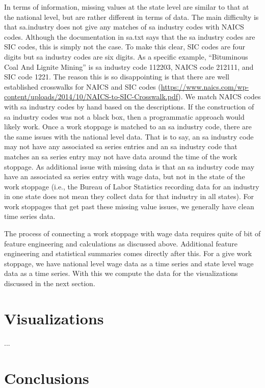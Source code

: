 \documentclass[reqno,11pt]{amsart}
\begin{document}
In terms of information, missing values at the state level are similar
to that at the national level, but are rather different in terms of data.
The main difficulty is that sa.industry does not give any matches of
sa industry codes with NAICS codes. Although the documentation in
sa.txt says that the sa industry codes are SIC codes, this is simply
not the case. To make this clear, SIC codes are four digits but
sa industry codes are six digits. As a specific example,
``Bituminous Coal And Lignite Mining'' is sa industry code 112203,	
NAICS code 212111, and SIC code 1221.
The reason this is so disappointing is that there are well established
crosswalks for NAICS and SIC codes
(\url{https://www.naics.com/wp-content/uploads/2014/10/NAICS-to-SIC-Crosswalk.pdf}).
We match NAICS codes with sa industry codes by hand based on the descriptions.
If the construction of sa industry codes was not a black box,
then a programmatic approach would likely work.
Once a work stoppage is matched to an sa industry code, there
are the same issues with the national level data. That is to say, 
an sa industry code may not have any associated sa series entries and
an sa industry code that matches an sa series entry may not have data
around the time of the work stoppage. As additional issue with missing data
is that an sa industry code may have an associated sa series entry
with wage data, but not in the state of the work stoppage (i.e., the 
Bureau of Labor Statistics recording data for an industry in one state
does not mean they collect data for that industry in all states).
For work stoppages that get past these missing value issues, we generally have
clean time series data.

The process of connecting a work stoppage with wage data requires quite of bit of feature engineering
and calculations as discussed above. Additional
feature engineering and statistical summaries comes directly after this.
For a give work stoppage, we have national level wage data as a time series and
state level wage data as a time series. With this we compute the data for the
visualizations discussed in the next section. 




\section{Visualizations}
...

\section{Conclusions}
\end{document}
